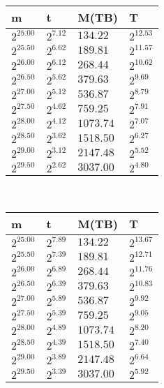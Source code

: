 \begin{tabular}{llll}
m & t & M(TB) & T \\ \hline
$2^{25.00}$ & $2^{7.12}$ & $134.22$ & $2^{12.53}$ \\
$2^{25.50}$ & $2^{6.62}$ & $189.81$ & $2^{11.57}$ \\
$2^{26.00}$ & $2^{6.12}$ & $268.44$ & $2^{10.62}$ \\
$2^{26.50}$ & $2^{5.62}$ & $379.63$ & $2^{9.69}$ \\
$2^{27.00}$ & $2^{5.12}$ & $536.87$ & $2^{8.79}$ \\
$2^{27.50}$ & $2^{4.62}$ & $759.25$ & $2^{7.91}$ \\
$2^{28.00}$ & $2^{4.12}$ & $1073.74$ & $2^{7.07}$ \\
$2^{28.50}$ & $2^{3.62}$ & $1518.50$ & $2^{6.27}$ \\
$2^{29.00}$ & $2^{3.12}$ & $2147.48$ & $2^{5.52}$ \\
$2^{29.50}$ & $2^{2.62}$ & $3037.00$ & $2^{4.80}$ \\
\end{tabular}
 \ 
\begin{tabular}{llll}
m & t & M(TB) & T \\ \hline
$2^{25.00}$ & $2^{7.89}$ & $134.22$ & $2^{13.67}$ \\
$2^{25.50}$ & $2^{7.39}$ & $189.81$ & $2^{12.71}$ \\
$2^{26.00}$ & $2^{6.89}$ & $268.44$ & $2^{11.76}$ \\
$2^{26.50}$ & $2^{6.39}$ & $379.63$ & $2^{10.83}$ \\
$2^{27.00}$ & $2^{5.89}$ & $536.87$ & $2^{9.92}$ \\
$2^{27.50}$ & $2^{5.39}$ & $759.25$ & $2^{9.05}$ \\
$2^{28.00}$ & $2^{4.89}$ & $1073.74$ & $2^{8.20}$ \\
$2^{28.50}$ & $2^{4.39}$ & $1518.50$ & $2^{7.40}$ \\
$2^{29.00}$ & $2^{3.89}$ & $2147.48$ & $2^{6.64}$ \\
$2^{29.50}$ & $2^{3.39}$ & $3037.00$ & $2^{5.92}$ \\
\end{tabular}
 \ 
